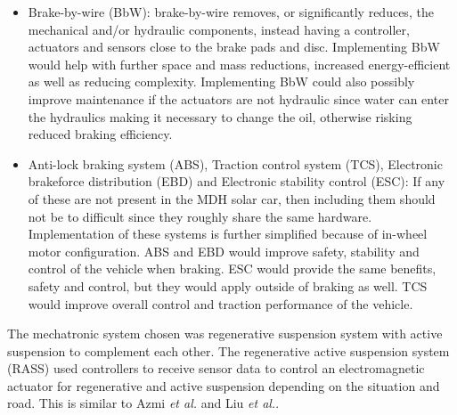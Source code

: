 \begin{itemize}
	\item Brake-by-wire (BbW): brake-by-wire removes, or significantly reduces, the mechanical and/or hydraulic components, instead having a controller, actuators and sensors close to the brake pads and disc\:\cite{khajepourElectricHybridVehicles2014}. Implementing BbW would help with further space and mass reductions, increased energy-efficient\:\cite{khajepourElectricHybridVehicles2014} as well as reducing complexity. Implementing BbW could also possibly improve maintenance if the actuators are not hydraulic since water can enter the hydraulics making it necessary to change the oil, otherwise risking reduced braking efficiency.
	\item Anti-lock braking system (ABS), Traction control system (TCS), Electronic brakeforce distribution (EBD) and Electronic stability control (ESC): If any of these are not present in the MDH solar car, then including them should not be to difficult since they roughly share the same hardware\:\cite{khajepourElectricHybridVehicles2014}. Implementation of these systems is further simplified because of in-wheel motor configuration\:\cite{othaganontMultiobjectiveOptimisationBattery2017}. ABS and EBD would improve safety, stability and control of the vehicle when braking\:\cite{khajepourElectricHybridVehicles2014}. ESC would provide the same benefits, safety and control, but they would apply outside of braking as well\:\cite{khajepourElectricHybridVehicles2014}. TCS would improve overall control and traction performance of the vehicle\:\cite{khajepourElectricHybridVehicles2014}.
\end{itemize}


The mechatronic system chosen was regenerative suspension system with active suspension to complement each other.
The regenerative active suspension system (RASS) used controllers to receive sensor data to control an electromagnetic actuator for regenerative and active suspension depending on the situation and road. This is similar to Azmi \textit{et al.}\:\cite{azmiNovelOptimalControl2023} and Liu \textit{et al.}\:\cite{liuTransmissionEnergyharvestingStudy2021}.

